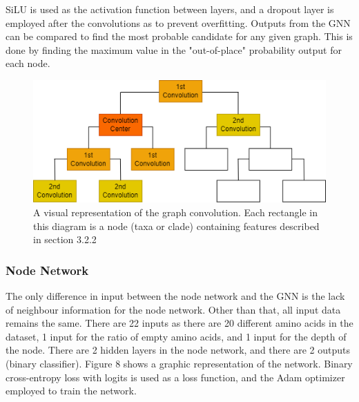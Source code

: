 \documentclass{mpaper}
\begin{document}
SiLU is used as the activation function between layers, and a dropout layer is employed after the convolutions as to prevent overfitting. Outputs from the GNN can be compared to find the most probable candidate for any given graph. This is done by finding the maximum value in the "out-of-place" probability output for each node.

\begin{figure}
    \includegraphics[width=1\linewidth]{dissertation/images/gcnn.png}
    \centering
    \caption{A visual representation of the graph convolution. Each rectangle in this diagram is a node (taxa or clade) containing features described in section 3.2.2}
\end{figure}


\subsubsection{Node Network}

The only difference in input between the node network and the GNN is the lack of neighbour information for the node network. Other than that, all input data remains the same. There are 22 inputs as there are 20 different amino acids in the dataset, 1 input for the ratio of empty amino acids, and 1 input for the depth of the node. There are 2 hidden layers in the node network, and there are 2 outputs (binary classifier). Figure 8 shows a graphic representation of the network. Binary cross-entropy loss with logits is used as a loss function, and the Adam optimizer \cite{kingma2014adam} employed to train the network. 
\end{document}
